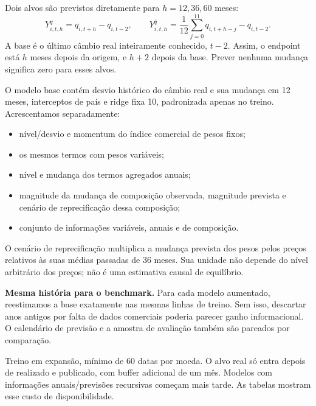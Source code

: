 \documentclass[11pt,a4paper]{article}
\begin{document}
Dois alvos são previstos diretamente para $h=12,36,60$ meses:
\[
Y^q_{i,t,h}=q_{i,t+h}-q_{i,t-2},\qquad
Y^{\bar q}_{i,t,h}=\frac1{12}\sum_{j=0}^{11}q_{i,t+h-j}-q_{i,t-2}.
\]
A base é o último câmbio real inteiramente conhecido, $t-2$. Assim, o endpoint está $h$ meses depois da origem, e $h+2$ depois da base. Prever nenhuma mudança significa zero para esses alvos.

O modelo base contém desvio histórico do câmbio real e sua mudança em 12 meses, interceptos de país e ridge fixa 10, padronizada apenas no treino. Acrescentamos separadamente:
\begin{itemize}
\item nível/desvio e momentum do índice comercial de pesos fixos;
\item os mesmos termos com pesos variáveis;
\item nível e mudança dos termos agregados anuais;
\item magnitude da mudança de composição observada, magnitude prevista e cenário de reprecificação dessa composição;
\item conjunto de informações variáveis, anuais e de composição.
\end{itemize}

O cenário de reprecificação multiplica a mudança prevista dos pesos pelos preços relativos às suas médias passadas de 36 meses. Sua unidade não depende do nível arbitrário dos preços; não é uma estimativa causal de equilíbrio.

\textbf{Mesma história para o benchmark.} Para cada modelo aumentado, reestimamos a base exatamente nas mesmas linhas de treino. Sem isso, descartar anos antigos por falta de dados comerciais poderia parecer ganho informacional. O calendário de previsão e a amostra de avaliação também são pareados por comparação.

Treino em expansão, mínimo de 60 datas por moeda. O alvo real só entra depois de realizado e publicado, com buffer adicional de um mês. Modelos com informações anuais/previsões recursivas começam mais tarde. As tabelas mostram esse custo de disponibilidade.

\clearpage
\end{document}

